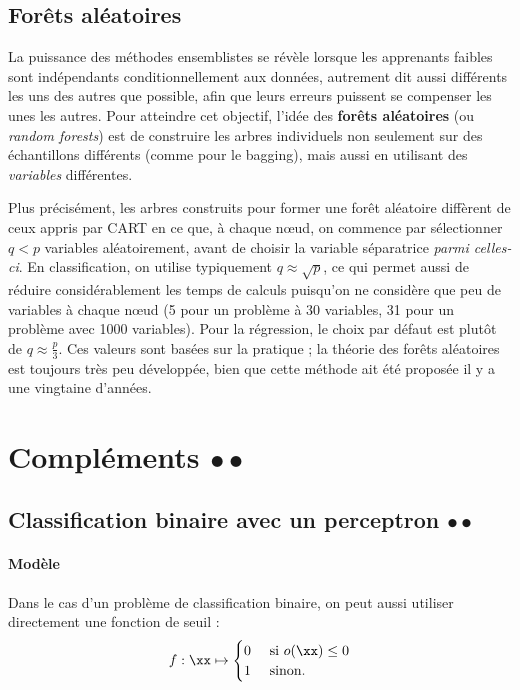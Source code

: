 \subsection{Forêts aléatoires}
La puissance des méthodes ensemblistes se révèle lorsque les apprenants faibles
sont indépendants conditionnellement aux données, autrement dit aussi
différents les uns des autres que possible, afin que leurs erreurs puissent se
compenser les unes les autres. Pour atteindre cet objectif, l'idée des
\textbf{forêts aléatoires} (ou \textit{random forests}) est de construire les
arbres individuels non seulement sur des échantillons différents (comme pour le
bagging), mais aussi en utilisant des {\it variables} différentes.

Plus précisément, les arbres construits pour former une forêt aléatoire
diffèrent de ceux appris par CART en ce que, à chaque n{\oe}ud, on commence par
sélectionner $q < p$ variables aléatoirement, avant de choisir la variable
séparatrice {\it parmi celles-ci}. En classification, on utilise typiquement
$q \approx \sqrt{p}$, ce qui permet aussi de réduire considérablement les temps
de calculs puisqu'on ne considère que peu de variables à chaque n{\oe}ud (5
pour un problème à 30 variables, 31 pour un problème avec 1000 variables). Pour
la régression, le choix par défaut est plutôt de $q \approx \frac{p}3.$ Ces
valeurs sont basées sur la pratique ; la théorie des forêts aléatoires est
toujours très peu développée, bien que cette méthode ait été proposée il y a
une vingtaine d'années.


\section{Compléments $\bullet \bullet$}

\subsection{Classification binaire avec un perceptron $\bullet \bullet$}
\label{sec:perceptron_binary}
\paragraph{Modèle}
Dans le cas d'un problème de classification binaire, on peut aussi utiliser
directement une fonction de seuil :
\begin{equation}
  \label{eq:seuil}
  f: \xx \mapsto 
  \begin{cases}
    0 & \text{ si } o(\xx) \leq 0 \\
    1 & \text{ sinon.}
  \end{cases}
\end{equation}


